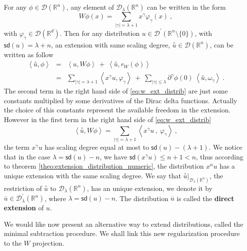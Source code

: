 \documentclass[11pt]{book}
\newcommand{\sd}{\mathsf{sd}}
\newcommand{\abs}[1]{\left|#1\right|}
\newcommand{\sm}[1]{\left\langle#1\right\rangle}
\newcommand{\exte}[1]{\overset{\circ}{#1}}
\newcommand{\Dcal}{\mathcal{D}}
\newcommand{\Rbb}{\mathbb{R}}
\theoremstyle{break}
\begin{document}
For any $\phi \in \Dcal(\Rbb^n)$, any element of $\Dcal_\lambda(\Rbb^n)$ can be written in the form
%
\begin{equation*}
W \phi(x) = \sum_{\abs{\gamma}=\lambda+1} x^\gamma \varphi_\gamma(x) \ ,
\end{equation*}
%
with $\varphi_\gamma \in \Dcal(\Rbb^d)$. Then for any distribution $u\in\Dcal^\prime(\Rbb^n\setminus\{0\})$, with $\sd(u) = \lambda +n$, an extension with same scaling degree, $\exte{u} \in \Dcal(\Rbb^n)$, can be written as follow
% 
\begin{eqnarray}
\sm{\exte{u},\phi} &=& \sm{u,W\phi} \ + \ \sm{\exte{u},r_W(\phi)} \nonumber \\
&=& \sum_{\abs{\gamma}=\lambda+1} \sm{x^\gamma u , \varphi_\gamma} \ + \ \sum_{\abs{\gamma}\leq\lambda} \partial^\gamma \phi(0) \ \sm{\exte{u},\omega_\gamma} \ .
\label{eq:w_ext_distrib}
\end{eqnarray}
%
The second term in the right hand side of \eqref{eq:w_ext_distrib} are just some constants multiplied by some derivatives of the Dirac delta functions. Actually the choice of this constants represent the available freedom in the extension. However in the first term in the right hand side of \eqref{eq:w_ext_distrib} 
% 
\begin{equation*}
\sm{\exte{u},W\phi} = \sum_{\abs{\gamma}=\lambda+1} \sm{x^\gamma u \ , \ \varphi_\gamma} \ ,
\end{equation*}
%
the term $x^\gamma u$ has scaling degree equal at most to $\sd(u) - (\lambda+1)$. We notice that in the case $\lambda = \sd(u) - n$, we have $\sd(x^\gamma u)\leq n+1 < n$, thus according to theorem \ref{theo:extension_distribution_numeric}, the distribution $x^\alpha u$ has a unique extension with the same scaling degree. We say that $\exte{u}|_{\Dcal_\lambda(\Rbb^n)}$, the restriction of $\exte{u}$ to $\Dcal_\lambda(\Rbb^n)$, has an unique extension, we denote it by $\overline{u} \in \Dcal^\prime_\lambda(\Rbb^n)$, where $\lambda = \sd(u) - n$. The distribution $\overline{u}$ is called the \textbf{direct extension} of $u$.


\bigskip


We would like now present an alternative way to extend distributions, called the minimal subtraction procedure. We shall link this new regularization procedure to the $W$ projection.
\end{document}
